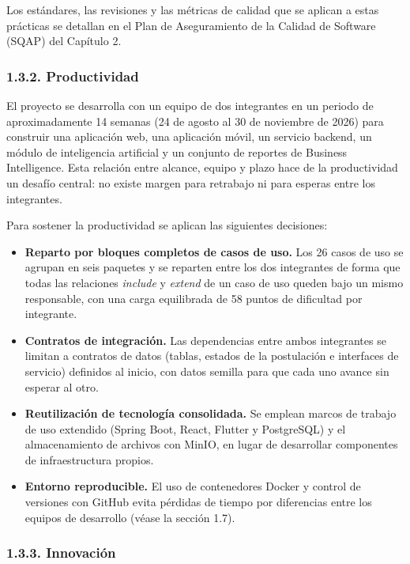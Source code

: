 Los estándares, las revisiones y las métricas de calidad que se aplican a estas prácticas se detallan en el Plan de Aseguramiento de la Calidad de Software (SQAP) del Capítulo 2.

\subsubsection{1.3.2. Productividad}

El proyecto se desarrolla con un equipo de dos integrantes en un periodo de aproximadamente 14 semanas (24 de agosto al 30 de noviembre de 2026) para construir una aplicación web, una aplicación móvil, un servicio backend, un módulo de inteligencia artificial y un conjunto de reportes de Business Intelligence. Esta relación entre alcance, equipo y plazo hace de la productividad un desafío central: no existe margen para retrabajo ni para esperas entre los integrantes.

Para sostener la productividad se aplican las siguientes decisiones:

\begin{itemize}
    \item \textbf{Reparto por bloques completos de casos de uso.} Los 26 casos de uso se agrupan en seis paquetes y se reparten entre los dos integrantes de forma que todas las relaciones \textit{include} y \textit{extend} de un caso de uso queden bajo un mismo responsable, con una carga equilibrada de 58 puntos de dificultad por integrante.
    \item \textbf{Contratos de integración.} Las dependencias entre ambos integrantes se limitan a contratos de datos (tablas, estados de la postulación e interfaces de servicio) definidos al inicio, con datos semilla para que cada uno avance sin esperar al otro.
    \item \textbf{Reutilización de tecnología consolidada.} Se emplean marcos de trabajo de uso extendido (Spring Boot, React, Flutter y PostgreSQL) y el almacenamiento de archivos con MinIO, en lugar de desarrollar componentes de infraestructura propios.
    \item \textbf{Entorno reproducible.} El uso de contenedores Docker y control de versiones con GitHub evita pérdidas de tiempo por diferencias entre los equipos de desarrollo (véase la sección 1.7).
\end{itemize}

\subsubsection{1.3.3. Innovación}

